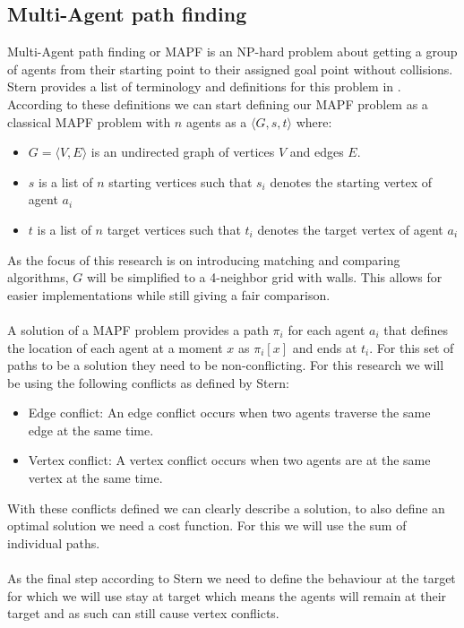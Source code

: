 \documentclass[english]{article}
\begin{document}
\subsection{Multi-Agent path finding}
Multi-Agent path finding or MAPF is an NP-hard problem about getting a group of agents from their starting point to their assigned goal point without collisions. Stern provides a list of terminology and definitions for this problem in \cite{stern2019multiagent}. According to these definitions we can start defining our MAPF problem as a classical MAPF problem with $n$ agents as a $\langle G,s,t\rangle$ where:
\begin{itemize}
	\item $G = \langle V,E\rangle$ is an undirected graph of vertices $V$ and edges $E$. 
	\item $s$ is a list of $n$ starting vertices such that $s_i$ denotes the starting vertex of agent $a_i$
	\item $t$ is a list of $n$ target vertices such that $t_i$ denotes the target vertex of agent $a_i$ 
\end{itemize}
As the focus of this research is on introducing matching and comparing algorithms, $G$ will be simplified to a 4-neighbor grid with walls.
This allows for easier implementations while still giving a fair comparison.
\\\\
A solution of a MAPF problem provides a path $\pi_i$ for each agent $a_i$ that defines the location of each agent at a moment $x$ as $\pi_i[x]$ and ends at $t_i$.
For this set of paths to be a solution they need to be non-conflicting.
For this research we will be using the following conflicts as defined by Stern\cite{stern2019multiagent}:
\begin{itemize}
	\item Edge conflict: An edge conflict occurs when two agents traverse the same edge at the same time.
	\item Vertex conflict: A vertex conflict occurs when two agents are at the same vertex at the same time.
\end{itemize}
With these conflicts defined we can clearly describe a solution, to also define an optimal solution we need a cost function.
For this we will use the sum of individual paths.
\\\\
As the final step according to Stern we need to define the behaviour at the target for which we will use stay at target which means the agents will remain at their target and as such can still cause vertex conflicts.
\end{document}
